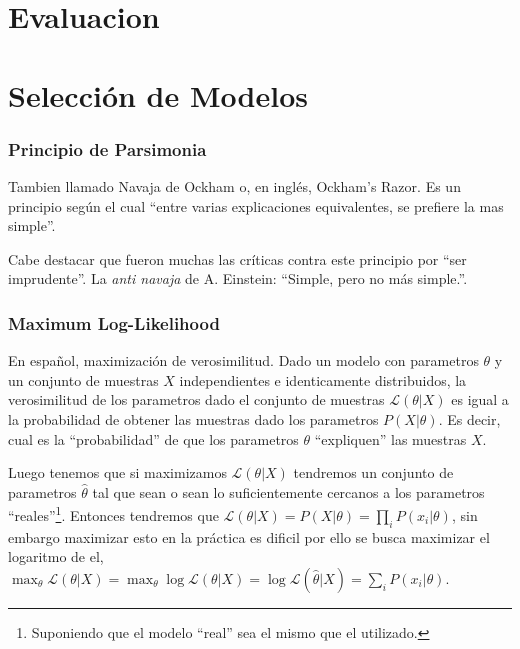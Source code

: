 \documentclass[10pt,a4paper]{article}
\begin{document}
\part{Evaluacion}

\part{Selección de Modelos}
\section{Principio de Parsimonia}
Tambien llamado Navaja de Ockham o, en inglés, Ockham's Razor. Es un principio según el cual ``entre varias explicaciones equivalentes, se prefiere la mas simple''. 

Cabe destacar que fueron muchas las críticas contra este principio por ``ser imprudente''. La \textit{anti navaja} de A. Einstein: ``Simple, pero no más simple.''.

\section{Maximum Log-Likelihood}
En español, maximización de verosimilitud. Dado un modelo con parametros $\theta$ y un conjunto de muestras $X$ independientes e identicamente distribuidos, la verosimilitud de los parametros dado el conjunto de muestras $\mathcal{L}(\theta|X)$ es igual a la probabilidad de obtener las muestras dado los parametros $P(X|\theta)$. Es decir, cual es la ``probabilidad'' de que los parametros $\theta$ ``expliquen'' las muestras $X$.

Luego tenemos que si maximizamos $\mathcal{L}(\theta|X)$ tendremos un conjunto de parametros $\hat{\theta}$ tal que sean o sean lo suficientemente cercanos a los parametros ``reales''\footnote{Suponiendo que el modelo ``real'' sea el mismo que el utilizado.}. Entonces tendremos que $\mathcal{L}(\theta|X) = P(X|\theta) = \prod_i P(x_i|\theta)$, sin embargo maximizar esto en la práctica es dificil por ello se busca maximizar el logaritmo de el, $\max_\theta \mathcal{L}(\theta|X) = \max_\theta \log \mathcal{L}(\theta|X) = \log \mathcal{L}(\hat{\theta}|X)= \sum_i P(x_i|\theta)$.

\end{document}
